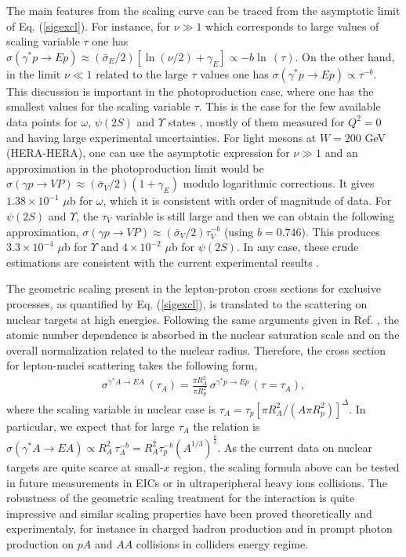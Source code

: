 \documentclass[twocolumn,showpacs,preprintnumbers,amsmath,amssymb,showkeys,aps,prd,a4paper,byrevtex]{revtex4}
\begin{document}
The main features from the scaling curve can be traced from the asymptotic limit of Eq. (\ref{sigexcl}). For instance, for $\nu\gg 1$ which corresponds to large values of scaling variable $\tau$ one has $\sigma (\gamma^*p\rightarrow Ep)\approx (\bar{\sigma}_E/2)\left[\ln(\nu/2)+\gamma_E \right] \propto -b \ln\, (\tau)$.  On the other hand, in the limit $\nu\ll 1$ related to the large $\tau$ values one has  $\sigma (\gamma^*p\rightarrow Ep)\propto \tau^{-b}$. This discussion is important in the photoproduction case, where one has the smallest values for the scaling variable $\tau $. This is the case for the  few available data points for $\omega $, $\psi (2S)$ and $\Upsilon$ states \cite{Capua}, mostly of them measured for $Q^2=0$ and having large experimental uncertainties.  For light mesons at $W = 200$ GeV (HERA-HERA), one can use the asymptotic expression for $\nu\gg 1$ and an approximation in the photoproduction limit would be $\sigma (\gamma p \rightarrow VP) \approx (\bar{\sigma}_V/2)(1+\gamma_E)$  modulo logarithmic corrections. It gives $1.38\times 10^{-1}$ $\mu$b for $\omega$, which it is consistent with order of magnitude of data. For $\psi (2S)$ and $\Upsilon$, the $\tau_V$ variable is still  large and then we can obtain the following approximation, $\sigma (\gamma p \rightarrow VP) \approx (\bar{\sigma}_V/2) \tau_V^{-b}$ (using $b=0.746$). This produces 
$3.3\times 10^{-4}$ $\mu$b for $\Upsilon$ and $4\times 10^{-2}$ $\mu$b for $\psi(2S)$.  In any case, these crude estimations are consistent with the 
current experimental results \cite{Capua}.


The geometric scaling present in the lepton-proton cross sections for exclusive processes, as quantified by Eq. (\ref{sigexcl}),  is translated to the scattering on nuclear targets at high energies. Following the same arguments given in Ref. \cite{Armesto_scal}, the atomic number dependence is absorbed in the nuclear saturation scale and on the overall normalization related to the nuclear radius. Therefore, the cross section for lepton-nuclei scattering takes the following form, 
\begin{eqnarray}
 \sigma^{\gamma^*A\rightarrow EA}\,(\tau_A)  =  \frac{\pi R_A^2}{\pi R_p^2}\,\sigma^{\gamma^*p\rightarrow Ep}\,\left(\tau = \tau_A\right),
\label{nuclear_scaling2}
\end{eqnarray}
where the scaling variable in nuclear case is $\tau_A = \tau_p[\pi R_A^2/(A 
\pi R_p^2)]^{\Delta}$. In particular, we expect that for large $\tau_A$ the relation  is $\sigma (\gamma^*A\rightarrow EA)\propto R_A^2\,\tau_A^{-b}=R_A^2 \tau_p^{-b}(A^{1/3})^{\frac{b}{\delta}}$.  As the current data on nuclear targets are quite scarce at small-$x$ region, the scaling formula above can be tested in future measurements in EICs or in ultraperipheral heavy ions collisions. The robustness of the geometric scaling treatment for the interaction is quite impressive and similar scaling properties have been proved theoretically and experimentaly, for instance in charged hadron production \cite{prazlach} and in prompt photon production \cite{prazlapf} on $pA$ and $AA$ collisions in colliders energy regime.
\end{document}
